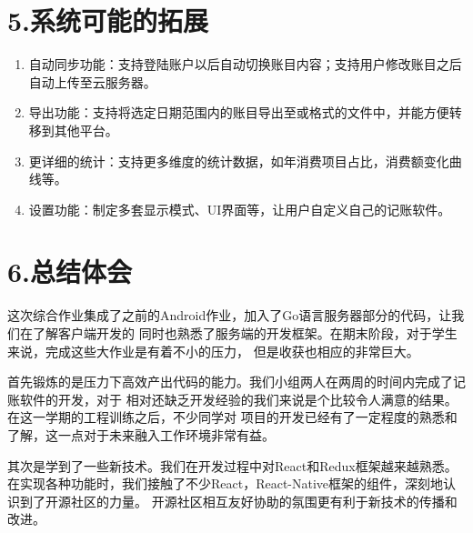 \documentclass{article}
\begin{document}
\section{5.\hspace*{0.5em}系统可能的拓展}\label{section}%

\begin{enumerate}%

\item{}
自动同步功能：支持登陆账户以后自动切换账目内容；支持用户修改账目之后自动上传至云服务器。%

\item{}
导出功能：支持将选定日期范围内的账目导出至或格式的文件中，并能方便转移到其他平台。%

\item{}
更详细的统计：支持更多维度的统计数据，如年消费项目占比，消费额变化曲线等。%

\item{}
设置功能：制定多套显示模式、UI界面等，让用户自定义自己的记账软件。%
\end{enumerate}%

\section{6.\hspace*{0.5em}总结体会}\label{section}%

\noindent{}这次综合作业集成了之前的Android作业，加入了Go语言服务器部分的代码，让我们在了解客户端开发的
同时也熟悉了服务端的开发框架。在期末阶段，对于学生来说，完成这些大作业是有着不小的压力，
但是收获也相应的非常巨大。%

首先锻炼的是压力下高效产出代码的能力。我们小组两人在两周的时间内完成了记账软件的开发，对于
相对还缺乏开发经验的我们来说是个比较令人满意的结果。在这一学期的工程训练之后，不少同学对
项目的开发已经有了一定程度的熟悉和了解，这一点对于未来融入工作环境非常有益。%

其次是学到了一些新技术。我们在开发过程中对React和Redux框架越来越熟悉。
在实现各种功能时，我们接触了不少React，React-Native框架的组件，深刻地认识到了开源社区的力量。
开源社区相互友好协助的氛围更有利于新技术的传播和改进。%
\end{document}
